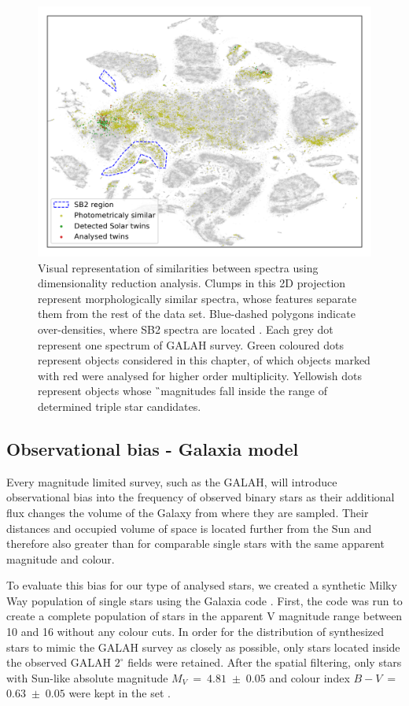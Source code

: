 \begin{figure}
	\centering
	\includegraphics[width=\textwidth]{evaluated_all_tsne.png}
	\caption{Visual representation of similarities between spectra using dimensionality reduction analysis. Clumps in this 2D projection represent morphologically similar spectra, whose features separate them from the rest of the data set. Blue-dashed polygons indicate over-densities, where SB2 spectra are located \citep[projection and regions are taken from Figure 13 in][]{buder2018}. Each grey dot represent one spectrum of GALAH survey. Green coloured dots represent objects considered in this chapter, of which objects marked with red were analysed for higher order multiplicity. Yellowish dots represent objects whose \G\ magnitudes fall inside the range of determined triple star candidates.}
	\label{fig:tsne_marked}
\end{figure}

\subsection{Observational bias - Galaxia model}
\label{sec:bias}
Every magnitude limited survey, such as the GALAH, will introduce observational bias into the frequency of observed binary stars as their additional flux changes the volume of the Galaxy from where they are sampled. Their distances and occupied volume of space is located further from the Sun and therefore also greater than for comparable single stars with the same apparent magnitude and colour.

To evaluate this bias for our type of analysed stars, we created a synthetic Milky Way population of single stars using the Galaxia code \citep{2011ApJ...730....3S}. First, the code was run to create a complete population of stars in the apparent V magnitude range between 10 and 16 without any colour cuts. In order for the distribution of synthesized stars to mimic the GALAH survey as closely as possible, only stars located inside the observed GALAH $2^\circ$ fields were retained. After the spatial filtering, only stars with Sun-like absolute magnitude $M_V~=~4.81$~$\pm$~$0.05$ and colour index $B-V$~=~$0.63$~$\pm$~$0.05$ were kept in the set \citep[reference magnitudes were taken from][]{2018ApJS..236...47W}.

